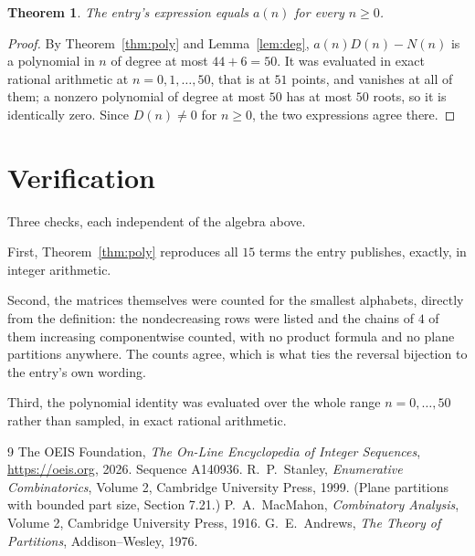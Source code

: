 \documentclass[11pt,a4paper]{article}
\theoremstyle{plain}
\newtheorem{theorem}{Theorem}
\theoremstyle{definition}
\begin{document}
\begin{theorem}
The entry's expression equals $a(n)$ for every $n\ge0$.
\end{theorem}

\begin{proof}
By Theorem~\ref{thm:poly} and Lemma~\ref{lem:deg}, $a(n)D(n)-N(n)$ is a polynomial in $n$
of degree at most $44+6=50$. It was evaluated in exact rational arithmetic at
$n=0,1,\dots,50$, that is at $51$ points, and vanishes at all of them; a nonzero polynomial
of degree at most $50$ has at most $50$ roots, so it is identically zero. Since $D(n)\neq0$
for $n\ge0$, the two expressions agree there.
\end{proof}

\section{Verification}

Three checks, each independent of the algebra above.

First, Theorem~\ref{thm:poly} reproduces all $15$ terms the entry publishes,
exactly, in integer arithmetic.

Second, the matrices themselves were counted for the smallest alphabets, directly from the
definition: the nondecreasing rows were listed and the chains of $4$ of them increasing
componentwise counted, with no product formula and no plane partitions anywhere. The counts
agree, which is what ties the reversal bijection to the entry's own wording.

Third, the polynomial identity was evaluated over the whole range $n=0,\dots,50$ rather than
sampled, in exact rational arithmetic.

\begin{thebibliography}{9}
 The OEIS Foundation, \emph{The On-Line Encyclopedia of Integer
Sequences}, \url{https://oeis.org}, 2026. Sequence A140936.
 R.~P.~Stanley, \emph{Enumerative Combinatorics}, Volume 2, Cambridge
University Press, 1999. (Plane partitions with bounded part size, Section 7.21.)
 P.~A.~MacMahon, \emph{Combinatory Analysis}, Volume 2, Cambridge
University Press, 1916.
 G.~E.~Andrews, \emph{The Theory of Partitions}, Addison--Wesley, 1976.
\end{thebibliography}
\end{document}
